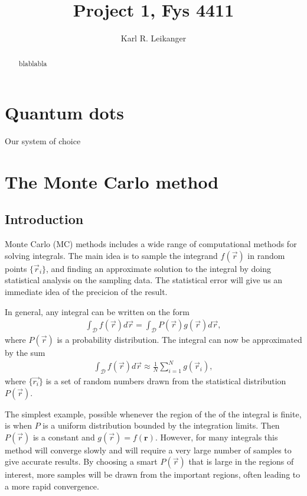 \documentclass[a4paper,10pt,twocolumn]{article} %
\title{ Project 1, Fys 4411 \\ }
\author{Karl R. Leikanger}
\newcommand{\ts}[1]{\textbf{#1}}
\begin{document}
\maketitle
\tableofcontents

\begin{abstract}%
blablabla
\end{abstract}%

\section{Quantum dots}%

Our system of choice 



\section{The Monte Carlo method}%

\subsection{Introduction}%
Monte Carlo (MC) methods includes a wide range of computational methods for solving integrals. 
The main idea is to sample the integrand $f(\vec r)$ in random points $\{\vec r_i\}$, 
and finding an approximate solution to the integral by doing statistical analysis on the sampling data. 
The statistical error will give us an immediate idea of the precicion of the result.

In general, any integral can be written on the form
\begin{align}
\int_{\mathcal D} f(\vec r) d\vec r = 
\int_{\mathcal D} P(\vec r) g(\vec r) d\vec r,
\end{align} 
where $P(\vec r)$ is a probability distribution. The integral can now be approximated by the sum 
\begin{align}
	\int_{\mathcal D} f(\vec r) d\vec r 
\approx \frac1N\sum_{i=1}^Ng(\vec r_i),
\end{align} 
where $\{\vec{r_i}\}$ is a set of random numbers drawn from the statistical distribution $P(\vec r)$.

The simplest example, possible whenever the region of the of the integral is finite,
is when $P$ is a uniform distribution bounded by the integration limits. Then
$P(\vec r)$ is a constant and $g(\vec r)=f(\ts r)$. However, for many integrals this method 
will converge slowly and will require a very large number of samples to
give accurate results. By choosing a smart $P(\vec r)$ that is large in the regions of interest, 
more samples will be drawn from the important regions, often leading to a more rapid convergence.  
\end{document}
